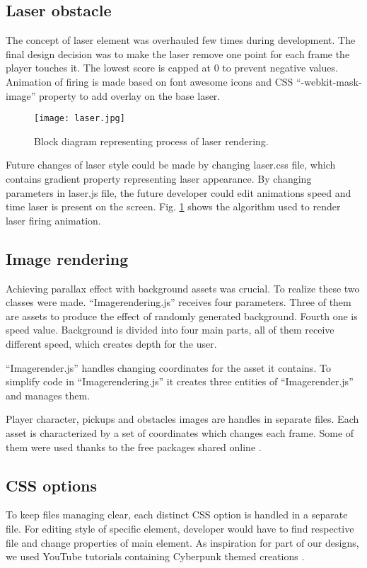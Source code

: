 \documentclass[oneside,a4paper,11pt]{report}
\begin{document}
\subsection{Laser obstacle}
The concept of laser element was overhauled few times during development. The final design decision was to make the laser remove one point for each frame the player touches it. The lowest score is capped at 0 to prevent negative values. Animation of firing is made based on font awesome icons and CSS “-webkit-mask-image” property to add overlay on the base laser.

\begin{figure}
	\centering
	\texttt{[image: laser.jpg]}
	\caption{Block diagram representing process of laser rendering.\label{fig:laser}}
\end{figure}

\par
Future changes of laser style could be made by changing laser.css file, which contains gradient property representing laser appearance. By changing parameters in laser.js file, the future developer could edit animations speed and time laser is present on the screen. Fig. \ref{fig:laser} shows the algorithm used to render laser firing animation.

\subsection{Image rendering}
Achieving parallax effect with background assets was crucial. To realize these two classes were made. “Image\textunderscore rendering.js” receives four parameters. Three of them are assets to produce the effect of randomly generated background. Fourth one is speed value. Background is divided into four main parts, all of them receive different speed, which creates depth for the user. 

\par
“Image\textunderscore render.js” handles changing coordinates for the asset it contains. To simplify code in “Image\textunderscore rendering.js” it creates three entities of “Image\textunderscore render.js” and manages them.

\par
Player character, pickups and obstacles images are handles in separate files. Each asset is characterized by a set of coordinates which changes each frame. Some of them were used thanks to the free packages shared online \cite{Facade009} \cite{Kitbash}.

\subsection{CSS options}
To keep files managing clear, each distinct CSS option is handled in a separate file. For editing style of specific element, developer would have to find respective file and change properties of main element. As inspiration for part of our designs, we used YouTube tutorials containing Cyberpunk themed creations \cite{CyberpunkCSS} \cite{GlitchCSS}.
\end{document}
